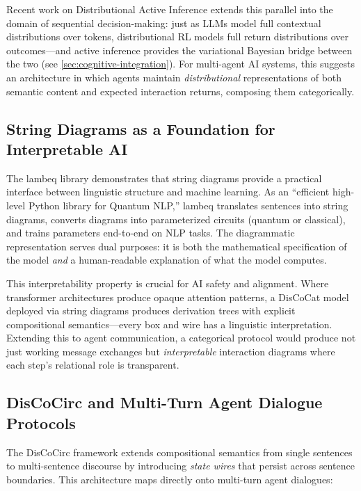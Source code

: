 \documentclass[
]{article}
\numberwithin{equation}{section}
\begin{document}
Recent work on Distributional Active Inference
\citep{akgul2026distributional} extends this parallel into the domain of
sequential decision-making: just as LLMs model full contextual
distributions over tokens, distributional RL models full return
distributions over outcomes---and active inference provides the
variational Bayesian bridge between the two (see
\autoref{sec:cognitive-integration}). For multi-agent AI systems, this
suggests an architecture in which agents maintain \emph{distributional}
representations of both semantic content and expected interaction
returns, composing them categorically.

\subsection{String Diagrams as a Foundation for Interpretable
AI}\label{string-diagrams-as-a-foundation-for-interpretable-ai}

The lambeq library \citep{lorenz2023lambeq} demonstrates that string
diagrams provide a practical interface between linguistic structure and
machine learning. As an ``efficient high-level Python library for
Quantum NLP,'' lambeq translates sentences into string diagrams,
converts diagrams into parameterized circuits (quantum or classical),
and trains parameters end-to-end on NLP tasks. The diagrammatic
representation serves dual purposes: it is both the mathematical
specification of the model \emph{and} a human-readable explanation of
what the model computes.

This interpretability property is crucial for AI safety and alignment.
Where transformer architectures produce opaque attention patterns, a
DisCoCat model deployed via string diagrams produces derivation trees
with explicit compositional semantics---every box and wire has a
linguistic interpretation. Extending this to agent communication, a
categorical protocol would produce not just working message exchanges
but \emph{interpretable} interaction diagrams where each step's
relational role is transparent.

\subsection{DisCoCirc and Multi-Turn Agent Dialogue
Protocols}\label{discocirc-and-multi-turn-agent-dialogue-protocols}

The DisCoCirc framework \citep{defelice2022discocirc} extends
compositional semantics from single sentences to multi-sentence
discourse by introducing \emph{state wires} that persist across sentence
boundaries. This architecture maps directly onto multi-turn agent
dialogues:
\end{document}
